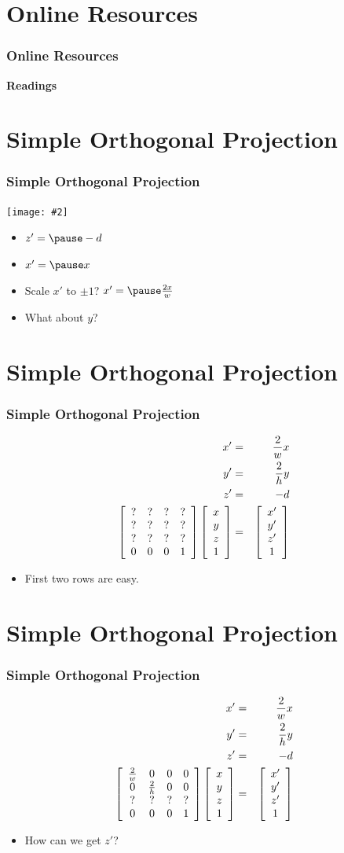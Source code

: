 \documentclass[slidestop,xcolor=pst]{beamer}
\newcommand{\graphc}[2]{\centerline{\texttt{[image: \#2]}}}
\newcommand{\sect}[1]{
\section{#1}
\begin{frame}[fragile]\frametitle{#1}
}
\begin{document}
\sect{Online Resources}
{\bf Readings}
\begin{itemize}
\end{itemize}

\end{frame}


\sect{Simple Orthogonal Projection}
\graphc{1}{orthogonal.png}
\begin{itemize}
\item $z' = \pause -d$
\item $x' = \pause x$
\pause\item Scale $x'$ to $\pm 1$? $x' = \pause \frac{2x}{w}$
\pause \item What about $y$?
\end{itemize}
\end{frame}

\sect{Simple Orthogonal Projection}
\begin{eqnarray*}
x' &=& \frac{2}{w}x\\
y' &=& \frac{2}{h}y\\
z' &=& -d\\
\left[\begin{array}{cccc} ?&?&?&? \\ ?&?&?&? \\ ?&?&?&? \\0&0&0&1\end{array}\right] \left[\begin{array}{c} x\\y\\z \\ 1\end{array}\right]&=&\left[\begin{array}{c} x'\\y'\\z' \\ 1\end{array}\right]
\end{eqnarray*}
\begin{itemize}
\item First two rows are easy.
\end{itemize}
\end{frame}

\sect{Simple Orthogonal Projection}
\begin{eqnarray*}
x' &=& \frac{2}{w}x\\
y' &=& \frac{2}{h}y\\
z' &=& -d\\
\left[\begin{array}{cccc} \frac{2}{w}&0&0&0 \\ 0&\frac{2}{h}&0&0 \\ ?&?&?&? \\0&0&0&1\end{array}\right] \left[\begin{array}{c} x\\y\\z \\ 1\end{array}\right]&=&\left[\begin{array}{c} x'\\y'\\z' \\ 1\end{array}\right]
\end{eqnarray*}
\begin{itemize}
\item How can we get $z'$?
\end{itemize}
\end{frame}
\end{document}
